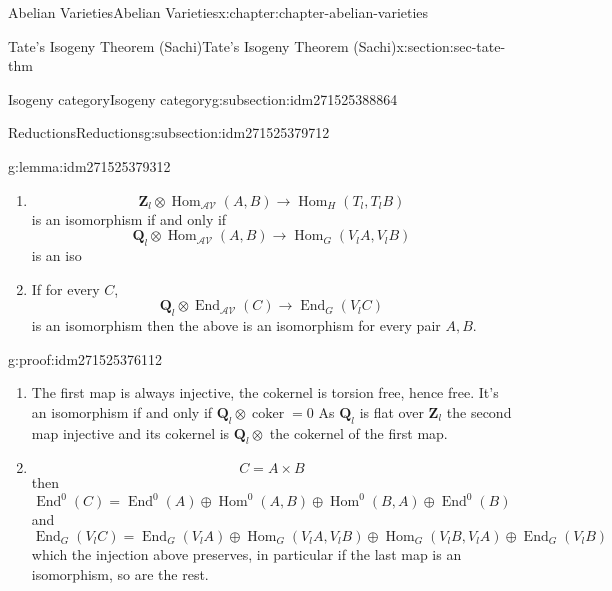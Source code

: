 \documentclass[oneside,10pt,]{book}
\numberwithin{equation}{section}
\newcommand{\ZZ}{\mathbf{Z}}
\newcommand{\QQ}{\mathbf{Q}}
\newcommand{\cat}[1]{\mathcal{#1}}
\DeclareMathOperator{\coker}{coker}
\DeclareMathOperator{\End}{End}
\DeclareMathOperator{\Hom}{Hom}
\begin{document}
\begin{chapterptx}{Abelian Varieties}{}{Abelian Varieties}{}{}{x:chapter:chapter-abelian-varieties}
\begin{sectionptx}{Tate's Isogeny Theorem (Sachi)}{}{Tate's Isogeny Theorem (Sachi)}{}{}{x:section:sec-tate-thm}
\begin{subsectionptx}{Isogeny category}{}{Isogeny category}{}{}{g:subsection:idm271525388864}
\begin{enumerate}
\end{enumerate}
%
\end{subsectionptx}
%
%
\typeout{************************************************}
\typeout{************************************************}
%
\begin{subsectionptx}{Reductions}{}{Reductions}{}{}{g:subsection:idm271525379712}
\begin{lemma}{}{}{g:lemma:idm271525379312}%
%
\begin{enumerate}
\item{}%
\begin{equation*}
\ZZ_l \otimes \Hom_\cat{AV} (A,B) \to \Hom_H(T_l, T_lB)
\end{equation*}
is an isomorphism if and only if%
\begin{equation*}
\QQ_l \otimes \Hom_\cat{AV} (A,B) \to \Hom_G(V_l A, V_l B)
\end{equation*}
is an iso%
\item{}If for every \(C\),%
\begin{equation*}
\QQ_l \otimes \End_\cat{AV} (C) \to \End_G(V_l C)
\end{equation*}
is an isomorphism then the above is an isomorphism for every pair \(A,B\).%
\end{enumerate}
%
\end{lemma}
\begin{proofptx}{}{g:proof:idm271525376112}
%
\begin{enumerate}
\item{}The first map is always injective, the cokernel is torsion free, hence free. It's an isomorphism if and only if \(\QQ_l \otimes \coker = 0\) As \(\QQ_l\) is flat over \(\ZZ_l\) the second map injective and its cokernel is \(\QQ_l \otimes\) the cokernel of the first map.%
\item{}%
\begin{equation*}
C = A\times B
\end{equation*}
then%
\begin{equation*}
\End^0(C) = \End^0(A)\oplus \Hom^0(A,B) \oplus \Hom^0(B,A) \oplus \End^0(B)
\end{equation*}
and%
\begin{equation*}
\End_G(V_lC) = \End_G(V_lA)\oplus \Hom_G(V_lA,V_lB) \oplus \Hom_G(V_lB,V_lA) \oplus \End_G(V_lB)
\end{equation*}
which the injection above preserves, in  particular if the last map is an isomorphism, so are the rest.%
\end{enumerate}

\end{proofptx}
\end{subsectionptx}
\end{sectionptx}
\end{chapterptx}
\end{document}
